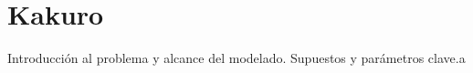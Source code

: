 
\section{Kakuro}\label{sec:02-kakuro}
Introducción al problema y alcance del modelado.
Supuestos y parámetros clave.a
